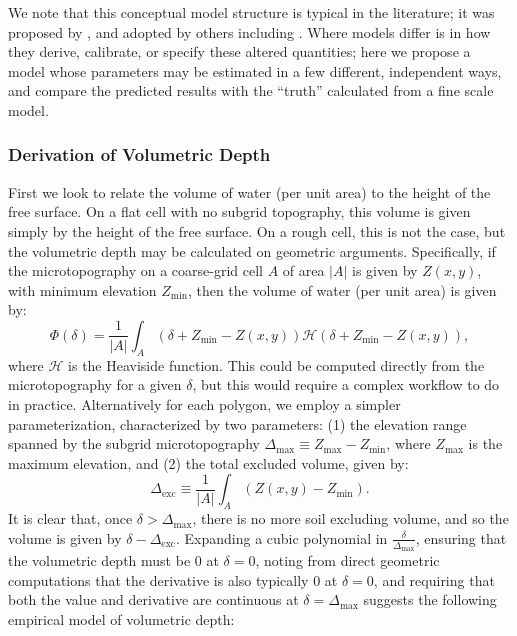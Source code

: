 \documentclass[review,11pt]{elsarticle}
\begin{document}
We note that this conceptual model structure is typical in the literature; it was proposed by \cite{stammers1956effect,mwendera1992estimation}, and adopted by others including \cite{panday2004fully,thompson2010role,frei2012surface,frei2014representing}.
Where models differ is in how they derive, calibrate, or specify these altered quantities; here we propose a model whose parameters may be estimated in a few different, independent ways, and compare the predicted results with the ``truth'' calculated from a fine scale model.

\subsubsection{Derivation of Volumetric Depth}
First we look to relate the volume of water (per unit area) to the height of the free surface.
On a flat cell with no subgrid topography, this volume is given simply by the height of the free surface.
On a rough cell, this is not the case, but the volumetric depth may be calculated on geometric arguments.
Specifically, if the microtopography on a coarse-grid cell $A$ of area $|A|$ is given by $Z(x,y)$, with minimum elevation $Z_\text{min}$, then the volume of water (per unit area) is given by:
%
\begin{equation}\label{volumetric-depth1}
\Phi (\delta) = \frac{1}{|A|} \int_A \left( \delta + Z_\text{min} - Z(x,y) \right ) \mathcal{H} \left( \delta + Z_\text{min} - Z(x,y) \right ),
\end{equation}
%
where $\mathcal{H}$ is the Heaviside function.
This could be computed directly from the microtopography for a given $\delta$, but this would require a complex workflow to do in practice.
Alternatively for each polygon, we employ a simpler parameterization, characterized by two parameters: (1) the elevation range spanned by the subgrid microtopography $\Delta_\text{max} \equiv Z_\text{max} - Z_\text{min}$, where $Z_\text{max}$ is the maximum elevation, and (2) the total excluded volume, given by:
%
\begin{equation}\label{volumetric-depth1b}
\Delta_\text{exc} \equiv \frac{1}{|A|} \int_A \left( Z(x,y) - Z_\text{min} \right ).
\end{equation}
%
It is clear that, once $\delta > \Delta_\text{max}$, there is no more soil excluding volume, and so the volume is given by $\delta - \Delta_\text{exc}.$
Expanding a cubic polynomial in $\frac{\delta}{\Delta_\text{max}}$, ensuring that the volumetric depth must be $0$ at $\delta = 0$, noting from direct geometric computations that the derivative is also typically $0$ at $\delta = 0$, and requiring that both the value and derivative are continuous at $\delta = \Delta_\text{max}$ suggests the following empirical model of volumetric depth:
\end{document}
